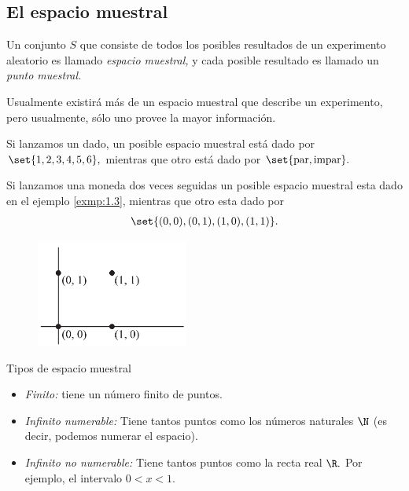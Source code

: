 \subsection{El espacio muestral}
{}
Un conjunto $S$ que consiste de todos los posibles resultados de un experimento aleatorio es llamado \emph{espacio muestral,}  y cada posible resultado es llamado un \emph{punto muestral.}

Usualmente existirá más de un espacio muestral que describe un experimento, pero usualmente, sólo uno provee la mayor información.

{}
\begin{ejemplo}
 \label{exmp:1.6}
 Si lanzamos un dado, un posible espacio muestral está dado por $\set{1,2,3,4,5,6},$  mientras que otro está dado por $\set{\text{par},\text{impar}}.$
\end{ejemplo}


{}
\begin{ejemplo}
 \label{exmp:1.7}
 Si lanzamos una moneda dos veces seguidas un posible espacio muestral esta dado en el ejemplo \ref{exmp:1.3},  mientras que otro esta dado por
 \begin{align*}
\set{(0,0), (0,1), (1,0),(1,1)}.
\end{align*}
\end{ejemplo}



\begin{figure}
 \centering
 \includegraphics[width=5cm,keepaspectratio=true]{./pe/pands0101.png}
 \label{fig:0101}
\end{figure}


{Tipos de espacio muestral}
\begin{itemize}
 \item \emph{Finito:} tiene un número finito de puntos.
 \item \emph{Infinito numerable:} Tiene tantos puntos como los números naturales $\N$ (es decir, podemos numerar el espacio).
 \item \emph{Infinito no numerable:} Tiene tantos puntos como la recta real $\R.$  Por ejemplo, el intervalo $0<x<1.$
\end{itemize}


